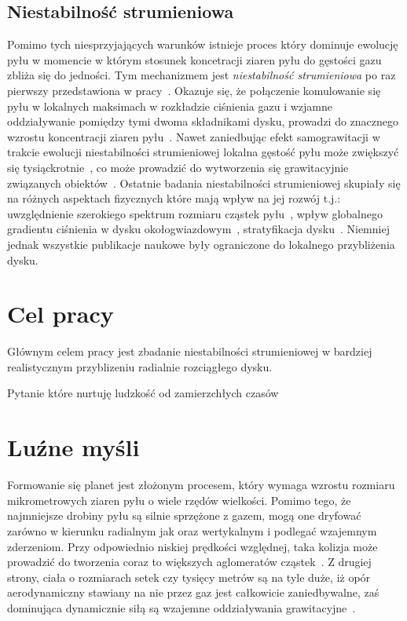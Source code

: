 \subsection{Niestabilność strumieniowa}

\par Pomimo tych niesprzyjających warunków istnieje proces który dominuje
ewolucję pyłu w momencie w którym stosunek koncetracji ziaren pyłu do gęstości
gazu zbliża się do jedności. Tym mechanizmem jest {\it niestabilność
strumieniowa} po raz pierwszy przedstawiona w pracy~\cite{YG05}. Okazuje się, że
połączenie komulowanie się pyłu w lokalnych maksimach w rozkładzie ciśnienia
gazu i wzjamne oddziaływanie pomiędzy tymi dwoma składnikami dysku, prowadzi do
znacznego wzrostu koncentracji ziaren pyłu~\citep{J11}. Nawet zaniedbując efekt
samograwitacji w trakcie ewolucji niestabilności strumieniowej lokalna gęstość
pyłu może zwiększyć się tysiąckrotnie~\cite{JY07}, co może prowadzić do
wytworzenia się grawitacyjnie związanych obiektów~\cite{J07}. Ostatnie badania
niestabilności strumieniowej skupiały się na różnych aspektach fizycznych które
mają wpływ na jej rozwój t.j.: uwzględnienie szerokiego spektrum rozmiaru
cząstek pyłu~\cite{BS10a}, wpływ globalnego gradientu ciśnienia w dysku
okołogwiazdowym~\cite{BS10b}, stratyfikacja dysku~\cite{T12}. Niemniej jednak
wszystkie publikacje naukowe były ograniczone do lokalnego przybliżenia dysku.

\section{Cel pracy}
Głównym celem pracy jest zbadanie niestabilności strumieniowej w bardziej
realistycznym przyblizeniu radialnie rozciągłego dysku.

 Pytanie które nurtuję ludzkość od
zamierzchłych czasów 

\section{Luźne myśli}

Formowanie się planet jest złożonym procesem, który wymaga wzrostu rozmiaru
mikrometrowych ziaren pyłu o wiele rzędów wielkości. Pomimo tego, że najmniejsze
drobiny pyłu są silnie sprzężone z gazem, mogą one dryfować zarówno w kierunku
radialnym jak oraz wertykalnym i podlegać wzajemnym zderzeniom. Przy odpowiednio
niskiej prędkości względnej, taka kolizja może prowadzić do tworzenia coraz to
większych aglomeratów cząstek~\citep{BW08}. Z drugiej strony, ciała o rozmiarach
setek czy tysięcy metrów są na tyle duże, iż opór aerodynamiczny stawiany na nie
przez gaz jest całkowicie zaniedbywalne, zaś dominująca dynamicznie siłą są
wzajemne oddziaływania grawitacyjne~\citep{KKI06}.

